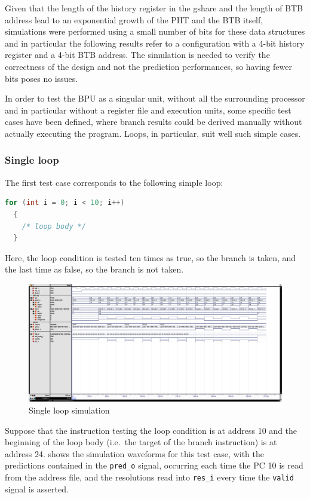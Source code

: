 Given that the length of the history register in the gshare and the length of \ac{BTB} address lead to an exponential growth of the \ac{PHT} and the \ac{BTB} itself, simulations were performed using a small number of bits for these data structures and in particular the following results refer to a configuration with a 4-bit history register and a 4-bit \ac{BTB} address. The simulation is needed to verify the correctness of the design and not the prediction performances, so having fewer bits poses no issues.

In order to test the \ac{BPU} as a singular unit, without all the surrounding processor and in particular without a register file and execution units, some specific test cases have been defined, where branch results could be derived manually without actually executing the program. Loops, in particular, suit well such simple cases.

\subsubsection{Single loop}
The first test case corresponds to the following simple loop:
\begin{lstlisting}[language=C]
  for (int i = 0; i < 10; i++)
  {
    /* loop body */
  }
\end{lstlisting}
Here, the loop condition is tested ten times as true, so the branch is taken, and the last time as false, so the branch is not taken.

\begin{figure}
  \centering
  \includegraphics[width=\textheight]{img/bpu_loop01_conv.png}
  \caption{Single loop simulation}
  \label{fig:bpu_loop01_conv}
\end{figure}
Suppose that the instruction testing the loop condition is at address 10 and the beginning of the loop body (i.e.\ the target of the branch instruction) is at address 24.  shows the simulation waveforms for this test case, with the predictions contained in the \texttt{pred\_o} signal, occurring each time the \ac{PC} 10 is read from the address file, and the resolutions read into \texttt{res\_i} every time the \texttt{valid} signal is asserted.

